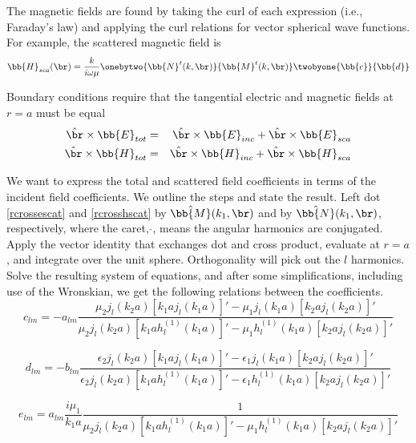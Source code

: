 \vspace{-2mm}
The magnetic fields are found by taking the curl of each expression (i.e., Faraday's law) and applying the curl relations for vector spherical wave functions. For example, the scattered magnetic field is 
\begin{equation}
\bb{H}_{sca}(\br) = \frac{k}{i\omega\mu}\onebytwo{\bb{N}^t(k,\br)}{\bb{M}^t(k,\br)}\twobyone{\bb{c}}{\bb{d}}
\end{equation}

Boundary conditions require that the tangential electric and magnetic fields at $r=a$ must be equal
\begin{eqnarray}
\hat{\br}\times\bb{E}_{tot} &=& \hat{\br}\times\bb{E}_{inc} + \hat{\br}\times\bb{E}_{sca} \label{rcrossescat} \\
\hat{\br}\times\bb{H}_{tot} &=& \hat{\br}\times\bb{H}_{inc} + \hat{\br}\times\bb{H}_{sca} \label{rcrosshscat}
\end{eqnarray}

We want to express the total and scattered field coefficients in terms of the incident field coefficients. We outline the steps and state the result. Left dot \eqref{rcrossescat} and \eqref{rcrosshscat} by $\hat{\bb{M}}(k_1,\br)$ and by $\hat{\bb{N}}(k_1,\br)$, respectively, where the caret, $\hat{}$, means the angular harmonics are conjugated.  Apply the vector identity that exchanges dot and cross product, evaluate at $r=a$, and integrate over the unit sphere. Orthogonality will pick out the $l$ harmonics. Solve the resulting system of equations, and after some simplifications, including use of the Wronskian, we get the following relations between the coefficients.
\begin{equation}
c_{lm} = -a_{lm}\dfrac{\mu_2 j_l(k_2a)\left[k_1aj_l(k_1a)\right]' - \mu_1 j_l(k_1a) \left[k_2aj_l(k_2a)\right]'}{\mu_2 j_l(k_2a) [k_1ah_l^{(1)}(k_1a)]' - \mu_1 h_l^{(1)}(k_1a)\left[k_2aj_l(k_2a)\right]'} \label{clmalm}
\end{equation}

\begin{equation}
d_{lm} = -b_{lm}\dfrac{\epsilon_2 j_l(k_2a)\left[k_1aj_l(k_1a)\right]' - \epsilon_1 j_l(k_1a) \left[k_2aj_l(k_2a)\right]'}{\epsilon_2 j_l(k_2a) [k_1ah_l^{(1)}(k_1a)]' - \epsilon_1 h_l^{(1)}(k_1a)\left[k_2aj_l(k_2a)\right]'} \label{dlmblm}
\end{equation}

\begin{equation}
e_{lm} = a_{lm}\dfrac{i\mu_1}{k_1a}\dfrac{1}{ \mu_2 j_l(k_2a) [k_1ah_l^{(1)}(k_1a)]' - \mu_1 h_l^{(1)}(k_1a)\left[k_2aj_l(k_2a)\right]' } \label{elmalm}
\end{equation}

